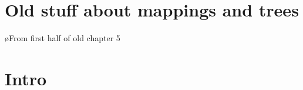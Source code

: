


%
%
%
%




%																
%																
%																
\section{Old stuff about mappings and trees}

\bl
\o From first half of old chapter 5
\el



%																
%																
%																
\section{Intro}

